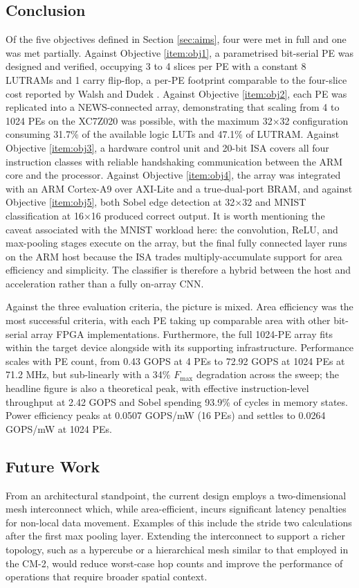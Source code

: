    \subsection{Conclusion}
        Of the five objectives defined in Section \ref{sec:aims}, four were met in full and one was met partially. Against Objective \ref{item:obj1}, a parametrised bit-serial PE was designed and verified, occupying 3 to 4 slices per PE with a constant 8 LUTRAMs and 1 carry flip-flop, a per-PE footprint comparable to the four-slice cost reported by Walsh and Dudek \cite{ref:walsh2012}. Against Objective \ref{item:obj2}, each PE was replicated into a NEWS-connected array, demonstrating that scaling from 4 to 1024 PEs on the XC7Z020 was possible, with the maximum 32×32 configuration consuming 31.7\% of the available logic LUTs and 47.1\% of LUTRAM. Against Objective \ref{item:obj3}, a hardware control unit and 20-bit ISA covers all four instruction classes with reliable handshaking communication between the ARM core and the processor. Against Objective \ref{item:obj4}, the array was integrated with an ARM Cortex-A9 over AXI-Lite and a true-dual-port BRAM, and against Objective \ref{item:obj5}, both Sobel edge detection at 32×32 and MNIST classification at 16×16 produced correct output. It is worth mentioning the caveat associated with the MNIST workload here: the convolution, ReLU, and max-pooling stages execute on the array, but the final fully connected layer runs on the ARM host because the ISA trades multiply-accumulate support for area efficiency and simplicity. The classifier is therefore a hybrid between the host and acceleration rather than a fully on-array CNN.
    
        Against the three evaluation criteria, the picture is mixed. Area efficiency was the most successful criteria, with each PE taking up comparable area with other bit-serial array FPGA implementations. Furthermore, the full 1024-PE array fits within the target device alongside with its supporting infrastructure. Performance scales with PE count, from 0.43 GOPS at 4 PEs to 72.92 GOPS at 1024 PEs at 71.2 MHz, but sub-linearly with a 34\% $F_\mathrm{max}$ degradation across the sweep; the headline figure is also a theoretical peak, with effective instruction-level throughput at 2.42 GOPS and Sobel spending 93.9\% of cycles in memory states. Power efficiency peaks at 0.0507 GOPS/mW (16 PEs) and settles to 0.0264 GOPS/mW at 1024 PEs.

    \subsection{Future Work}\label{sec:futwork}
        From an architectural standpoint, the current design employs a two-dimensional mesh interconnect which, while area-efficient, incurs significant latency penalties for non-local data movement. Examples of this include the stride two calculations after the first max pooling layer. Extending the interconnect to support a richer topology, such as a hypercube or a hierarchical mesh similar to that employed in the CM-2, would reduce worst-case hop counts and improve the performance of operations that require broader spatial context.
        
